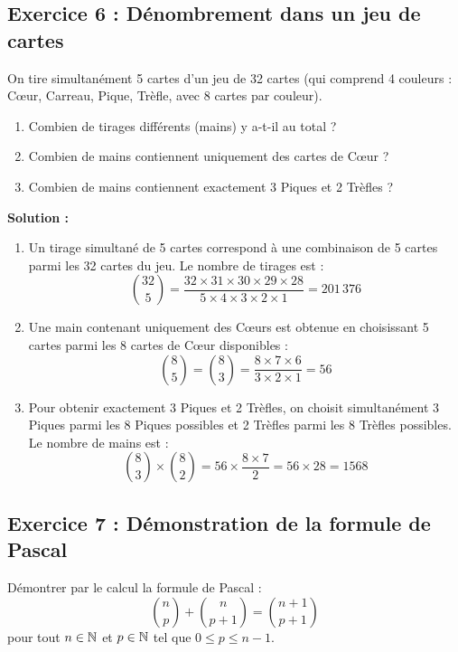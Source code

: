 \subsection*{Exercice 6 : Dénombrement dans un jeu de cartes}
On tire simultanément 5 cartes d'un jeu de 32 cartes (qui comprend 4 couleurs : Cœur, Carreau, Pique, Trèfle, avec 8 cartes par couleur).
\begin{enumerate}
    \item Combien de tirages différents (mains) y a-t-il au total ?
    \item Combien de mains contiennent uniquement des cartes de Cœur ?
    \item Combien de mains contiennent exactement 3 Piques et 2 Trèfles ?
\end{enumerate}

\textbf{Solution :}
\begin{enumerate}
    \item Un tirage simultané de 5 cartes correspond à une combinaison de 5 cartes parmi les 32 cartes du jeu. Le nombre de tirages est :
    \[
    \binom{32}{5} = \frac{32 \times 31 \times 30 \times 29 \times 28}{5 \times 4 \times 3 \times 2 \times 1} = 201\,376
    \]
    
    \item Une main contenant uniquement des Cœurs est obtenue en choisissant 5 cartes parmi les 8 cartes de Cœur disponibles :
    \[
    \binom{8}{5} = \binom{8}{3} = \frac{8 \times 7 \times 6}{3 \times 2 \times 1} = 56
    \]
    
    \item Pour obtenir exactement 3 Piques et 2 Trèfles, on choisit simultanément 3 Piques parmi les 8 Piques possibles et 2 Trèfles parmi les 8 Trèfles possibles. Le nombre de mains est :
    \[
    \binom{8}{3} \times \binom{8}{2} = 56 \times \frac{8 \times 7}{2} = 56 \times 28 = 1568
    \]
\end{enumerate}

\subsection*{Exercice 7 : Démonstration de la formule de Pascal}
Démontrer par le calcul la formule de Pascal :
\[
\binom{n}{p} + \binom{n}{p+1} = \binom{n+1}{p+1}
\]
pour tout $n \in \mathbb{N}$ et $p \in \mathbb{N}$ tel que $0 \le p \le n-1$.

